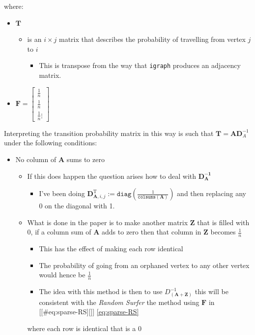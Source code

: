 \documentclass[11pt]{article}
\begin{document}
where:

\begin{itemize}
\item \(\mathbf{T}\)

\begin{itemize}
\item is an \(i \times j\) matrix that describes the probability of
travelling from vertex \(j\) to \(i\)

\begin{itemize}
\item This is transpose from the way that \texttt{igraph} produces an adjacency
matrix.
\end{itemize}
\end{itemize}

\item \(\mathbf{F} = \begin{bmatrix} \frac{1}{n} \\ \frac{1}{n} \\ \frac{1}{n} \vdots \end{bmatrix}\)
\end{itemize}

Interpreting the transition probability matrix in this way is such that
\(\mathbf{T}= \mathbf{A}\mathbf{D}^{- 1}_A\) under the following
conditions:


\begin{itemize}
\item No column of \(\mathbf{A}\) sums to zero

\begin{itemize}
\item If this does happen the question arises how to deal with
\(\mathbf{D_\mathbf{A}^{- 1}}\)

\begin{itemize}
\item I've been doing \(\mathbf{D}^{\mathrm{T}}_{\mathbf{A}, i, j} := \mathtt{diag} \left( {\frac{1}{\mathtt{colsums}\left( \mathbf{A} \right)}} \right)\)
and then replacing any \(0\) on the diagonal with 1.
\end{itemize}

\item What is done in the paper is to make another matrix \(\mathbf{Z}\)
that is filled with 0, if a column sum of \(\mathbf{A}\) adds to zero
then that column in \(\mathbf{Z}\) becomes \(\frac{1}{n}\)

\begin{itemize}
\item This has the effect of making each row identical

\item The probability of going from an orphaned vertex to any other
vertex would hence be \(\frac{1}{n}\)

\item The idea with this method is then to use
\(D_\mathbf{\left( A+Z \right)}^{- 1}\) this will be consistent with
the \emph{Random Surfer} the method using \(\mathbf{F}\) in
[[\#eq:sparse-RS][]] \eqref{eq:sparse-RS}
\end{itemize}

where each row is identical that is a 0
\end{itemize}
\end{itemize}
\end{document}
